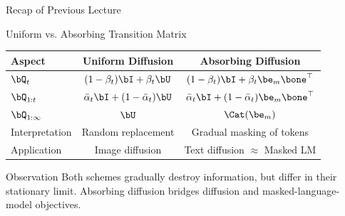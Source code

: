\documentclass{beamer}
\begin{document}
\begin{frame}{Recap of Previous Lecture}
	\begin{block}{Uniform vs. Absorbing Transition Matrix}
        \begin{table}[h!]
            \centering
            \small
            \begin{tabular}{lcc}
                \toprule
                \textbf{Aspect} & \textbf{Uniform Diffusion} & \textbf{Absorbing Diffusion} \\
                \midrule
                $\bQ_t$
                    & $(1-\beta_t)\bI + \beta_t \bU$ 
                    & $(1-\beta_t)\bI + \beta_t \be_m\bone^\top$ \\[4pt]
                $\bQ_{1:t}$
                    & $\bar\alpha_t \bI + (1-\bar\alpha_t)\bU$
                    & $\bar\alpha_t \bI + (1-\bar\alpha_t)\be_m\bone^\top$ \\[4pt]
                $\bQ_{1:\infty}$
                    & $\bU$
                    & $\Cat(\be_m)$ \\[4pt]
                Interpretation
                    & Random replacement
                    & Gradual masking of tokens \\[4pt]
                Application
                    & Image diffusion
                    & Text diffusion $\approx$ Masked LM \\[4pt]
                \bottomrule
            \end{tabular}
        \end{table}
    \end{block}
	\begin{block}{Observation}
		Both schemes gradually destroy information, but differ in their stationary limit.
		Absorbing diffusion bridges diffusion and masked-language-model objectives.
	\end{block}
\end{frame}
\end{document}
